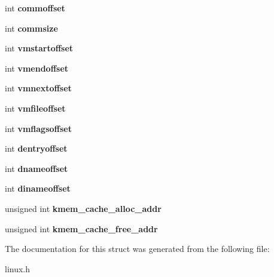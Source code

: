 \begin{DoxyCompactItemize}
\item 
\hypertarget{structPEMU__guest__os_a3bb63d3cd5dfa311c43adcacc7cb0252}{int {\bfseries commoffset}}\label{structPEMU__guest__os_a3bb63d3cd5dfa311c43adcacc7cb0252}

\item 
\hypertarget{structPEMU__guest__os_ac8b33d2c4681dfff9ca1471206ef610d}{int {\bfseries commsize}}\label{structPEMU__guest__os_ac8b33d2c4681dfff9ca1471206ef610d}

\item 
\hypertarget{structPEMU__guest__os_a49a57f4201ecc1f84a54683666f2366b}{int {\bfseries vmstartoffset}}\label{structPEMU__guest__os_a49a57f4201ecc1f84a54683666f2366b}

\item 
\hypertarget{structPEMU__guest__os_a4caa9deea40d91cab7255fe71d1e87e6}{int {\bfseries vmendoffset}}\label{structPEMU__guest__os_a4caa9deea40d91cab7255fe71d1e87e6}

\item 
\hypertarget{structPEMU__guest__os_a395905beb92833ce54be084f08790033}{int {\bfseries vmnextoffset}}\label{structPEMU__guest__os_a395905beb92833ce54be084f08790033}

\item 
\hypertarget{structPEMU__guest__os_a2e5635ebce183325b293d967b27494ce}{int {\bfseries vmfileoffset}}\label{structPEMU__guest__os_a2e5635ebce183325b293d967b27494ce}

\item 
\hypertarget{structPEMU__guest__os_a31268c8807ba66000cde329b15fc14de}{int {\bfseries vmflagsoffset}}\label{structPEMU__guest__os_a31268c8807ba66000cde329b15fc14de}

\item 
\hypertarget{structPEMU__guest__os_a915c9f8f7f3c84866575de2530f2b566}{int {\bfseries dentryoffset}}\label{structPEMU__guest__os_a915c9f8f7f3c84866575de2530f2b566}

\item 
\hypertarget{structPEMU__guest__os_a4320807578ef99c97e883e282e8cc030}{int {\bfseries dnameoffset}}\label{structPEMU__guest__os_a4320807578ef99c97e883e282e8cc030}

\item 
\hypertarget{structPEMU__guest__os_acb92dbebc434ae9c715cf1bb9b98c980}{int {\bfseries dinameoffset}}\label{structPEMU__guest__os_acb92dbebc434ae9c715cf1bb9b98c980}

\item 
\hypertarget{structPEMU__guest__os_a96c341588ccc5352faf3e543e3462bc3}{unsigned int {\bfseries kmem\-\_\-cache\-\_\-alloc\-\_\-addr}}\label{structPEMU__guest__os_a96c341588ccc5352faf3e543e3462bc3}

\item 
\hypertarget{structPEMU__guest__os_adcacc0b259fbb1c7dcf623c3082dbcff}{unsigned int {\bfseries kmem\-\_\-cache\-\_\-free\-\_\-addr}}\label{structPEMU__guest__os_adcacc0b259fbb1c7dcf623c3082dbcff}

\end{DoxyCompactItemize}


\-The documentation for this struct was generated from the following file\-:\begin{DoxyCompactItemize}
\item 
linux.\-h\end{DoxyCompactItemize}

